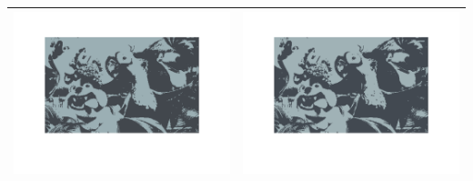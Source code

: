 \documentclass[fleqn]{article}
\begin{document}
\begin{center}
\begin{longtable}{ c | c }
	\includegraphics[scale=0.4]{./pics/task1and2/rio_k=2_random/K=2_iteration_5_random_2_rio.png} & \includegraphics[scale=0.4]{./pics/task1and2/rio_k=2_random/K=2_iteration_6_random_2_rio.png} \\\hline

\end{longtable}
\end{center}
\end{document}
